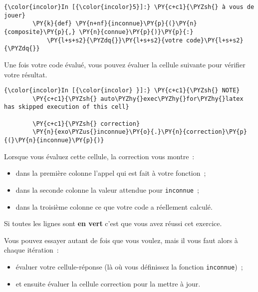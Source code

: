     \begin{Verbatim}[commandchars=\\\{\}]
{\color{incolor}In [{\color{incolor}5}]:} \PY{c+c1}{\PYZsh{} à vous de jouer}
        \PY{k}{def} \PY{n+nf}{inconnue}\PY{p}{(}\PY{n}{composite}\PY{p}{,} \PY{n}{connue}\PY{p}{)}\PY{p}{:}
            \PY{l+s+s2}{\PYZdq{}}\PY{l+s+s2}{votre code}\PY{l+s+s2}{\PYZdq{}}
\end{Verbatim}


    Une fois votre code évalué, vous pouvez évaluer la cellule suivante pour
vérifier votre résultat.

    \begin{Verbatim}[commandchars=\\\{\}]
{\color{incolor}In [{\color{incolor} }]:} \PY{c+c1}{\PYZsh{} NOTE}
        \PY{c+c1}{\PYZsh{} auto\PYZhy{}exec\PYZhy{}for\PYZhy{}latex has skipped execution of this cell}
        
        \PY{c+c1}{\PYZsh{} correction}
        \PY{n}{exo\PYZus{}inconnue}\PY{o}{.}\PY{n}{correction}\PY{p}{(}\PY{n}{inconnue}\PY{p}{)}
\end{Verbatim}


    Lorsque vous évaluez cette cellule, la correction vous montre~:

\begin{itemize}
\tightlist
\item
  dans la première colonne l'appel qui est fait à votre fonction~;
\item
  dans la seconde colonne la valeur attendue pour \texttt{inconnue}~;
\item
  dans la troisième colonne ce que votre code a réellement calculé.
\end{itemize}

Si toutes les lignes sont \textbf{en vert} c'est que vous avez réussi
cet exercice.

    Vous pouvez essayer autant de fois que vous voulez, mais il vous faut
alors à chaque itération~:

\begin{itemize}
\tightlist
\item
  évaluer votre cellule-réponse (là où vous définissez la fonction
  \texttt{inconnue})~;
\item
  et ensuite évaluer la cellule correction pour la mettre à jour.
\end{itemize}


    
    
    

